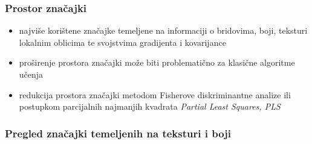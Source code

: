 \documentclass{beamer}
\begin{document}
\begin{frame}
\frametitle{Prostor značajki}
\begin{itemize}
\item najviše korištene značajke temeljene na informaciji o bridovima, boji, teksturi lokalnim oblicima te svojstvima gradijenta i kovarijance
\item proširenje prostora značajki može biti problematično za klasične algoritme učenja 
\item redukcija prostora značajki metodom Fisherove diskriminantne analize ili postupkom parcijalnih najmanjih kvadrata \emph{Partial Least Squares, PLS}
\end{itemize}
\end{frame}

\begin{frame}
\frametitle{Pregled značajki temeljenih na teksturi i boji}
\end{frame}
\end{document}
